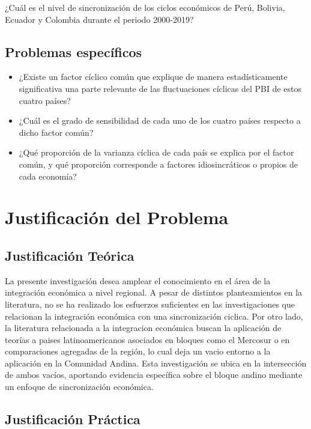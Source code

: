 \documentclass[
  spanish,
  11pt,
  letterpaper,
  letterpaper,
  12pt]{book}
\begin{document}
¿Cuál es el nivel de sincronización de los ciclos económicos de Perú,
Bolivia, Ecuador y Colombia durante el periodo 2000-2019?

\subsection{Problemas específicos}\label{problemas-especuxedficos}

\begin{itemize}
\item
  ¿Existe un factor cíclico común que explique de manera
  estadísticamente significativa una parte relevante de las
  fluctuaciones cíclicas del PBI de estos cuatro países?
\item
  ¿Cuál es el grado de sensibilidad de cada uno de los cuatro países
  respecto a dicho factor común?
\item
  ¿Qué proporción de la varianza cíclica de cada país se explica por el
  factor común, y qué proporción corresponde a factores idiosincráticos
  o propios de cada economía?
\end{itemize}

\section{Justificación del
Problema}\label{justificaciuxf3n-del-problema}

\subsection{Justificación Teórica}\label{justificaciuxf3n-teuxf3rica}

La presente investigación desea amplear el conocimiento en el área de la
integración económica a nivel regional. A pesar de distintos
planteamientos en la literatura, no se ha realizado los esfuerzos
suficientes en las investigaciones que relacionan la integración
económica con una sincronización ciclica. Por otro lado, la literatura
relacionada a la integracion económica buscan la aplicación de teorías a
paises latinoamericanos asociados en bloques como el Mercosur o en
comparaciones agregadas de la región, lo cual deja un vacio entorno a la
aplicación en la Comunidad Andina. Esta investigación se ubica en la
intersección de ambos vacíos, aportando evidencia específica sobre el
bloque andino mediante un enfoque de sincronización económica.

\subsection{Justificación Práctica}\label{justificaciuxf3n-pruxe1ctica}
\end{document}
